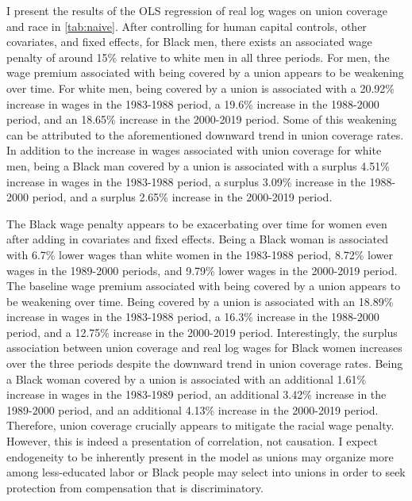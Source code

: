 \documentclass[11pt]{article}
\begin{document}
I present the results of the OLS regression of real log wages on union coverage and race in \autoref{tab:naive}. After controlling for human capital controls, other covariates, and fixed effects, for Black men, there exists an associated wage penalty of around 15\% relative to white men in all three periods. For men, the wage premium associated with being covered by a union appears to be weakening over time. For white men, being covered by a union is associated with a 20.92\% increase in wages in the 1983-1988 period, a 19.6\% increase in the 1988-2000 period, and an 18.65\% increase in the 2000-2019 period. Some of this weakening can be attributed to the aforementioned downward trend in union coverage rates. In addition to the increase in wages associated with union coverage for white men, being a Black man covered by a union is associated with a surplus 4.51\% increase in wages in the 1983-1988 period, a surplus 3.09\% increase in the 1988-2000 period, and a surplus 2.65\% increase in the 2000-2019 period.

The Black wage penalty appears to be exacerbating over time for women even after adding in covariates and fixed effects. Being a Black woman is associated with 6.7\% lower wages than white women in the 1983-1988 period, 8.72\% lower wages in the 1989-2000 periods, and 9.79\% lower wages in the 2000-2019 period. The baseline wage premium associated with being covered by a union appears to be weakening over time. Being covered by a union is associated with an 18.89\% increase in wages in the 1983-1988 period, a 16.3\% increase in the 1988-2000 period, and a 12.75\% increase in the 2000-2019 period. Interestingly, the surplus association between union coverage and real log wages for Black women increases over the three periods despite the downward trend in union coverage rates. Being a Black woman covered by a union is associated with an additional 1.61\% increase in wages in the 1983-1989 period, an additional 3.42\% increase in the 1989-2000 period, and an additional 4.13\% increase in the 2000-2019 period. Therefore, union coverage crucially appears to mitigate the racial wage penalty. However, this is indeed a presentation of correlation, not causation. I expect endogeneity to be inherently present in the model as unions may organize more among less-educated labor or Black people may select into unions in order to seek protection from compensation that is discriminatory. 
\end{document}
